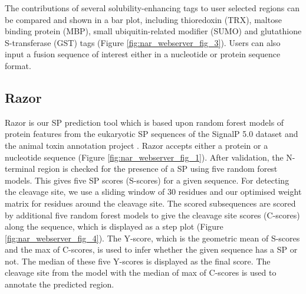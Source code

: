 The contributions of several solubility-enhancing tags to user selected
regions can be compared and shown in a bar plot, including thioredoxin
(TRX), maltose binding protein (MBP), small ubiquitin-related modifier
(SUMO) and glutathione S-transferase (GST) tags (Figure \ref{fig:nar_webserver_fig_3}). Users can also input a
fusion sequence of interest either in a nucleotide or protein sequence
format.


\subsection{Razor}

Razor is our SP prediction tool which is based upon random forest models
of protein features from the eukaryotic SP sequences of the SignalP 5.0
dataset and the animal toxin annotation project
\cite{Almagro_Armenteros2019-vr,Bhandari2020-oj,Jungo2012-ja}. Razor accepts
either a protein or a nucleotide sequence (Figure \ref{fig:nar_webserver_fig_1}). After validation, the
N-terminal region is checked for the presence of a SP using five random
forest models. This gives five SP scores (S-scores) for a given
sequence. For detecting the cleavage site, we use a sliding window of $30$
residues and our optimised weight matrix for residues around the
cleavage site. The scored subsequences are scored by additional five
random forest models to give the cleavage site scores (C-scores) along
the sequence, which is displayed as a step plot (Figure \ref{fig:nar_webserver_fig_4}). The Y-score, which is
the geometric mean of S-scores and the max of C-scores, is used to infer
whether the given sequence has a SP or not. The median of these five
Y-scores is displayed as the final score. The cleavage site from the
model with the median of max of C-scores is used to annotate the
predicted region.


